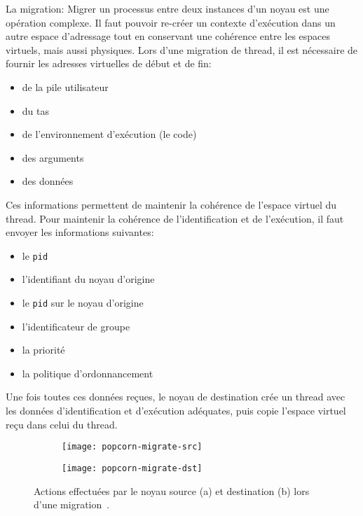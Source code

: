       \begin{paragraph}{La migration: }
        Migrer un processus entre deux instances d'un noyau est une opération
        complexe. Il faut pouvoir re-créer un contexte d'exécution dans un autre
        espace d'adressage tout en conservant une cohérence entre les espaces
        virtuels, mais aussi physiques. Lors d'une migration de thread, il est
        nécessaire de fournir les adresses virtuelles de début et de fin:
        \begin{itemize}
          \item de la pile utilisateur
          \item du tas
          \item de l'environnement d'exécution (le code)
          \item des arguments
          \item des données
        \end{itemize}
        Ces informations permettent de maintenir la cohérence de l'espace
        virtuel du thread. Pour maintenir la cohérence de l'identification et de
        l'exécution, il faut envoyer les informations suivantes:
        \begin{itemize}
          \item le \texttt{pid}
          \item l'identifiant du noyau d'origine
          \item le \texttt{pid} sur le noyau d'origine
          \item l'identificateur de groupe
          \item la priorité
          \item la politique d'ordonnancement
        \end{itemize}
        Une fois toutes ces données reçues, le noyau de destination crée un
        thread avec les données d'identification et d'exécution adéquates, puis
        copie l'espace virtuel reçu dans celui du thread.

        \begin{figure}[ht]
          \begin{subfigure}[b]{0.45\textwidth}
            \texttt{[image: popcorn-migrate-src]}
            \caption{}
            \label{fig:popcorn-migrate-src}
          \end{subfigure}
          \begin{subfigure}[b]{0.5\textwidth}
            \texttt{[image: popcorn-migrate-dst]}
            \caption{}
            \label{fig:popcorn-migrate-dst}
          \end{subfigure}
          \caption{Actions effectuées par le noyau source (a) et destination (b)
            lors d'une migration~\citep{katz2013popcorn}.}
        \end{figure}

      \end{paragraph}

